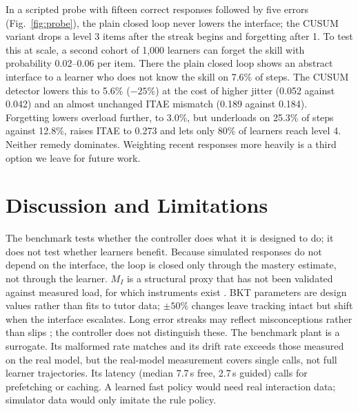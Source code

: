 \documentclass[conference]{IEEEtran}
\begin{document}
In a scripted probe with fifteen correct responses followed by five errors
(Fig.~\ref{fig:probe}), the plain closed loop never lowers the interface; the CUSUM variant drops a
level 3 items after the streak begins and forgetting after 1. To test this
at scale, a second cohort of 1,000 learners can forget the skill with
probability 0.02--0.06 per item. There the plain closed loop shows an
abstract interface to a learner who does not know the skill on 7.6\% of
steps. The CUSUM detector lowers this to 5.6\% ($-25\%$) at the cost of
higher jitter (0.052 against 0.042) and an almost unchanged ITAE mismatch
(0.189 against 0.184). Forgetting lowers overload further, to 3.0\%, but
underloads on 25.3\% of steps against 12.8\%, raises ITAE to 0.273 and
lets only 80\% of learners reach level 4. Neither remedy dominates. Weighting recent responses more heavily
\cite{galyardt2015recent} is a third option we leave for future work.

\section{Discussion and Limitations}

The benchmark tests whether the controller does what it is designed to do; it
does not test whether learners benefit. Because simulated responses do not
depend on the interface, the loop is closed only through the mastery
estimate, not through the learner. $M_I$ is a structural proxy that has not
been validated against measured load, for which instruments exist
\cite{leppink2013instrument}. BKT
parameters are design values rather than fits to tutor data; $\pm 50\%$
changes leave tracking intact but shift when the interface escalates. Long error
streaks may reflect misconceptions rather than slips
\cite{booth2014persistent}; the controller does not distinguish these.
The benchmark plant is a surrogate. Its malformed rate matches and its drift rate
exceeds those measured on the real model, but the real-model measurement covers single
calls, not full learner trajectories. Its latency (median 7.7\,s free,
2.7\,s guided) calls for prefetching or caching.
A learned fast policy would need real interaction data; simulator data
would only imitate the rule policy.
\end{document}
